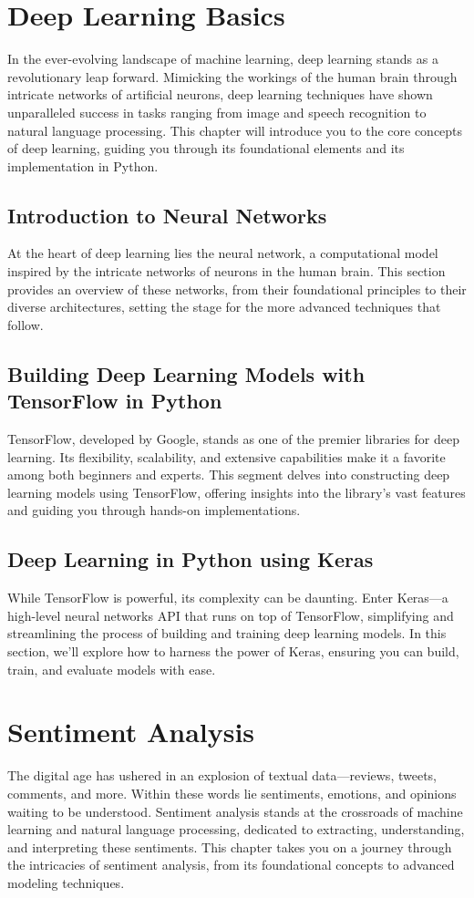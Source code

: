 \documentclass[a4paper,12pt]{book}
\begin{document}
\chapter{Deep Learning Basics}
In the ever-evolving landscape of machine learning, deep learning stands as a revolutionary leap forward. Mimicking the workings of the human brain through intricate networks of artificial neurons, deep learning techniques have shown unparalleled success in tasks ranging from image and speech recognition to natural language processing. This chapter will introduce you to the core concepts of deep learning, guiding you through its foundational elements and its implementation in Python.

\section{Introduction to Neural Networks}
At the heart of deep learning lies the neural network, a computational model inspired by the intricate networks of neurons in the human brain. This section provides an overview of these networks, from their foundational principles to their diverse architectures, setting the stage for the more advanced techniques that follow.

\section{Building Deep Learning Models with TensorFlow in Python}
TensorFlow, developed by Google, stands as one of the premier libraries for deep learning. Its flexibility, scalability, and extensive capabilities make it a favorite among both beginners and experts. This segment delves into constructing deep learning models using TensorFlow, offering insights into the library's vast features and guiding you through hands-on implementations.

\section{Deep Learning in Python using Keras}
While TensorFlow is powerful, its complexity can be daunting. Enter Keras—a high-level neural networks API that runs on top of TensorFlow, simplifying and streamlining the process of building and training deep learning models. In this section, we'll explore how to harness the power of Keras, ensuring you can build, train, and evaluate models with ease.

\chapter{Sentiment Analysis}
The digital age has ushered in an explosion of textual data—reviews, tweets, comments, and more. Within these words lie sentiments, emotions, and opinions waiting to be understood. Sentiment analysis stands at the crossroads of machine learning and natural language processing, dedicated to extracting, understanding, and interpreting these sentiments. This chapter takes you on a journey through the intricacies of sentiment analysis, from its foundational concepts to advanced modeling techniques.
\end{document}
